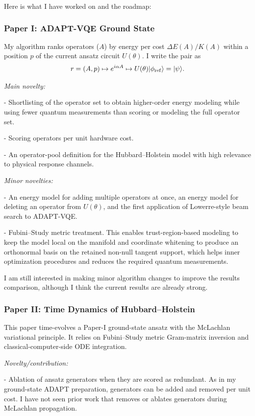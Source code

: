 \documentclass[11pt]{article}
\begin{document}
Here is what I have worked on and the roadmap:

\subsubsection*{Paper I: ADAPT-VQE Ground State}
My algorithm ranks operators ($A$) by energy per cost $\Delta E(A)/K(A)$ within a position $p$ of the current ansatz circuit $U(\theta)$. I write the pair as
\[
r=(A,p) \mapsto e^{i\alpha A} \mapsto U(\theta)|\phi_{\rm ref}\rangle=|\psi\rangle.
\]

\textit{Main novelty:}

- Shortlisting of the operator set to obtain higher-order energy modeling while using fewer quantum measurements than scoring or modeling the full operator set.

- Scoring operators per unit hardware cost.

- An operator-pool definition for the Hubbard--Holstein model with high relevance to physical response channels.

\textit{Minor novelties:}

- An energy model for adding multiple operators at once, an energy model for deleting an operator from $U(\theta)$, and the first application of Lowerre-style beam search to ADAPT-VQE.

- Fubini--Study metric treatment. This enables trust-region-based modeling to keep the model local on the manifold and coordinate whitening to produce an orthonormal basis on the retained non-null tangent support, which helps inner optimization procedures and reduces the required quantum measurements.

I am still interested in making minor algorithm changes to improve the results comparison, although I think the current results are already strong.


\subsubsection*{Paper II: Time Dynamics of Hubbard--Holstein}
This paper time-evolves a Paper-I ground-state ansatz with the McLachlan variational principle. It relies on Fubini--Study metric Gram-matrix inversion and classical-computer-side ODE integration.

\textit{Novelty/contribution:}

- Ablation of ansatz generators when they are scored as redundant. As in my ground-state ADAPT preparation, generators can be added and removed per unit cost. I have not seen prior work that removes or ablates generators during McLachlan propagation.
\end{document}
